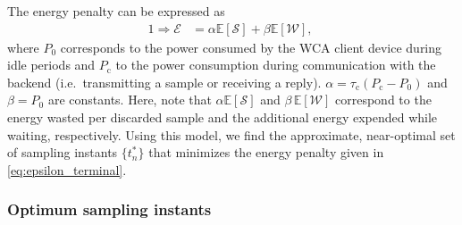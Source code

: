 
The energy penalty can be expressed as
\begin{alignat}{1}
    \Rightarrow\mathcal{E}&=\alpha\mathbb{E}[\mathcal{S}]+\beta\mathbb{E}[\mathcal{W}],\;\label{eq:epsilon_terminal}
\end{alignat}
where \( P_0 \) corresponds to the power consumed by the \ac{WCA} client device during idle periods and \( P_\text{c} \) to the power consumption during communication with the backend (i.e.\ transmitting a sample or receiving a reply).
$\alpha = \tau_{\text{c}} (P_{\text{c}} - P_0)$ and $\beta = P_0$ are constants.
Here, note that $\alpha\mathbb{E}[\mathcal{S}]$ and $\beta\,\mathbb{E}[\mathcal{W}]$ correspond to the energy wasted per discarded sample and the additional energy expended while waiting, respectively.
Using this model, we find the approximate, near-optimal set of sampling instants $\{t_n^*\}$ that minimizes the energy penalty given in \cref{eq:epsilon_terminal}.

\subsubsection{Optimum sampling instants}\label{sec:aprxSol}

